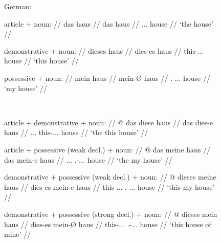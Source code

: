 \begin{figure}
\ex{}\label{ex:germandetdist}%
German:\medskip\\
\begin{minipage}[t]{.4\remaining}
	\tl\quad\begingl
		\glpreamble article + noun: //
		\gla das haus //
		\glb das haus //
		\glc \Def{}.\Nom{}.\Sg{}.\N{} house //
		\glft `the house' //
	\endgl\medskip

	\tl\quad\begingl
		\glpreamble demonstrative + noun: //
		\gla dieses haus //
		\glb dies-es haus //
		\glc this-\Nom{}.\Sg{}.\N{}.\St{} house //
		\glft `this house' //
	\endgl\medskip

	\tl\quad\begingl
		\glpreamble possessive + noun: //
		\gla mein haus //
		\glb mein-Ø haus //
		\glc \Fsg{}.\Gen{}-\Nom{}.\Sg{}.\N{}.\St{} house //
		\glft `my house' //
	\endgl
\end{minipage}
~
\begin{minipage}[t]{.6\remaining}
	\tl\quad\begingl
		\glpreamble article + demonstrative + noun: //
		\gla * @ das diese haus //
		\glb {} das dies-e haus //
		\glc {} \Def{}.\Nom{}.\Sg{}.\N{} this-\Nom{}.\Sg{}.\N{}.\Wk{} house //
		\glft \hphantom{*}`the this house' //
	\endgl\medskip

	\tl\quad\begingl
		\glpreamble article + possessive (weak decl.) + noun: //
		\gla * @ das meine haus //
		\glb {} das mein-e haus //
		\glc {} \Def{}.\Nom{}.\Sg{}.\N{} \Fsg{}.\Gen{}-\Nom{}.\Sg{}.\N{}.\Wk{} 
			house //
		\glft \hphantom{*}`the my house' //
	\endgl\medskip

	\tl\quad\label{ex:germandemposswk}\begingl
		\glpreamble demonstrative + possessive (weak decl.) + noun: //
		\gla * @ dieses meine haus //
		\glb {} dies-es mein-e haus //
		\glc {} this-\Nom{}.\Sg{}.\N{}.\St{} 
			\Fsg{}.\Gen{}-\Nom{}.\Sg{}.\N{}.\Wk{} house //
		\glft \hphantom{*}`this my house' //
	\endgl\medskip

	\tl\quad\label{ex:germandemposs}\begingl
		\glpreamble demonstrative + possessive (strong decl.) + noun: //
		\gla \hash{} @ dieses mein haus //
		\glb {} dies-es mein-Ø haus //
		\glc {} this-\Nom{}.\Sg{}.\N{}.\St{} 
			\Fsg{}.\Gen{}-\Nom{}.\Sg{}.\N{}.\St{} house //
		\glft \hphantom{\hash}`this house of mine' //
	\endgl
\end{minipage}
\xe
\end{figure}

